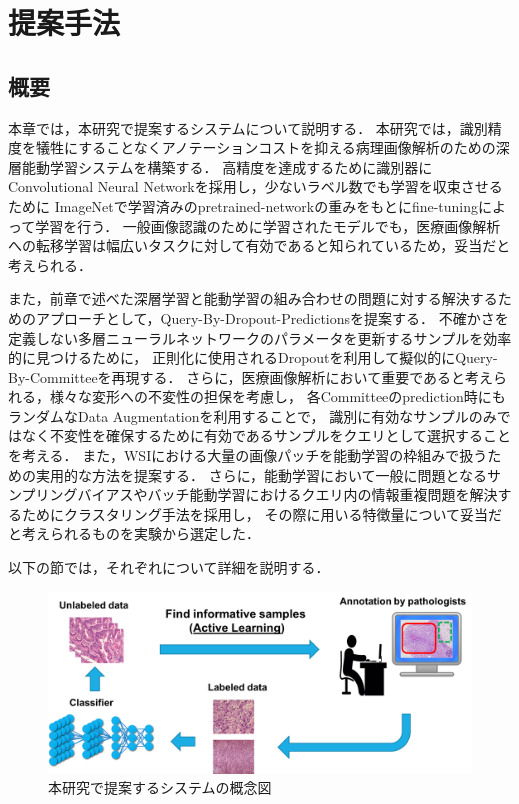 \chapter{提案手法}

\section{概要}
本章では，本研究で提案するシステムについて説明する．
本研究では，識別精度を犠牲にすることなくアノテーションコストを抑える病理画像解析のための深層能動学習システムを構築する．
高精度を達成するために識別器にConvolutional Neural Networkを採用し，少ないラベル数でも学習を収束させるために
ImageNetで学習済みのpretrained-networkの重みをもとにfine-tuningによって学習を行う．
一般画像認識のために学習されたモデルでも，医療画像解析への転移学習は幅広いタスクに対して有効であると知られているため，妥当だと考えられる．

また，前章で述べた深層学習と能動学習の組み合わせの問題に対する解決するためのアプローチとして，Query-By-Dropout-Predictionsを提案する．
不確かさを定義しない多層ニューラルネットワークのパラメータを更新するサンプルを効率的に見つけるために，
正則化に使用されるDropoutを利用して擬似的にQuery-By-Committeeを再現する．
さらに，医療画像解析において重要であると考えられる，様々な変形への不変性の担保を考慮し，
各Committeeのprediction時にもランダムなData Augmentationを利用することで，
識別に有効なサンプルのみではなく不変性を確保するために有効であるサンプルをクエリとして選択することを考える．
また，WSIにおける大量の画像パッチを能動学習の枠組みで扱うための実用的な方法を提案する．
さらに，能動学習において一般に問題となるサンプリングバイアスやバッチ能動学習におけるクエリ内の情報重複問題を解決するためにクラスタリング手法を採用し，
その際に用いる特徴量について妥当だと考えられるものを実験から選定した．

以下の節では，それぞれについて詳細を説明する．

\clearpage

\begin{figure}[tbp]
    \label{fig:overview}
     \begin{center}
      \includegraphics[width=120mm]{figures/overview.png}
     \end{center}
    \caption{本研究で提案するシステムの概念図}
\end{figure}

